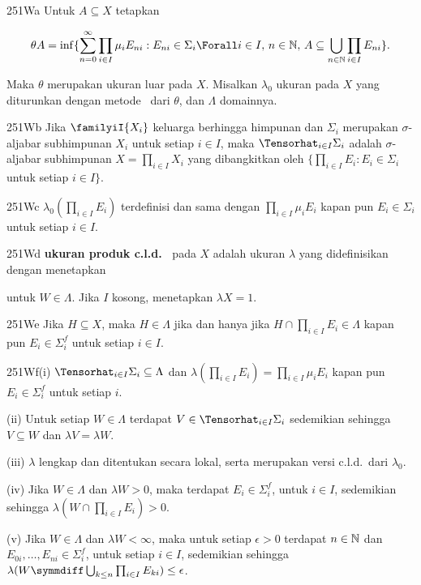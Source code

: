 \spheader 251Wa Untuk $A\subseteq X$ tetapkan

$$\theta A=\inf\{\sum_{n=0}^{\infty}\prod_{i\in I}\mu_iE_{ni}:
E_{ni}\in\Sigma_i\Forall i\in I,\,n\in\Bbb N,\,
A\subseteq\bigcup_{n\in\Bbb N}\prod_{i\in I}E_{ni}\}.$$

\noindent Maka $\theta$ merupakan ukuran luar pada $X$. Misalkan $\lambda_0$
ukuran pada $X$ yang diturunkan dengan metode \Caratheodory\ dari $\theta$, dan
$\Lambda$ domainnya.

\spheader 251Wb Jika $\familyiI{X_i}$ keluarga berhingga himpunan dan
$\Sigma_i$ merupakan $\sigma$-aljabar subhimpunan $X_i$ untuk setiap $i\in I$,
maka $\Tensorhat_{i\in I}\Sigma_i$ adalah $\sigma$-aljabar subhimpunan
$X=\prod_{i\in I}X_i$ yang dibangkitkan oleh $\{\prod_{i\in I}E_i:E_i\in\Sigma_i$
untuk setiap $i\in I\}$. 

\spheader 251Wc $\lambda_0(\prod_{i\in I}E_i)$ terdefinisi dan sama dengan
$\prod_{i\in I}\mu_iE_i$ kapan pun $E_i\in\Sigma_i$ untuk setiap $i\in I$.

\spheader 251Wd {\bf ukuran produk c.l.d.\ } pada $X$ adalah ukuran
$\lambda$ yang didefinisikan dengan menetapkan


\noindent untuk $W\in\Lambda$. Jika $I$ kosong,  menetapkan
$\lambda X=1$.

\spheader 251We Jika $H\subseteq X$, maka $H\in\Lambda$ jika dan hanya jika
$H\cap\prod_{i\in I}E_i\in\Lambda$ kapan pun $E_i\in\Sigma_i^f$ untuk setiap
$i\in I$.

\spheader 251Wf(i) $\Tensorhat_{i\in I}\Sigma_i\subseteq\Lambda$ dan
$\lambda(\prod_{i\in I}E_i)=\prod_{i\in I}\mu_iE_i$ kapan pun
$E_i\in\Sigma_i^f$ untuk setiap $i$.

\quad(ii) Untuk setiap $W\in\Lambda$ terdapat $V\in\Tensorhat_{i\in
I}\Sigma_i$ sedemikian sehingga $V\subseteq W$ dan $\lambda V=\lambda W$.

\quad(iii) $\lambda$ lengkap dan ditentukan secara lokal, serta merupakan
versi c.l.d.\ dari $\lambda_0$.

\quad(iv) Jika $W\in\Lambda$ dan $\lambda W>0$, maka terdapat
$E_i\in\Sigma_i^f$, untuk $i\in I$, sedemikian sehingga
$\lambda(W\cap\prod_{i\in I}E_i)>0$.

\quad(v) Jika $W\in\Lambda$ dan $\lambda W<\infty$, maka untuk setiap
$\epsilon>0$ terdapat $n\in\Bbb N$ dan
$E_{0i},\ldots,E_{ni}\in\Sigma_i^f$, untuk setiap $i\in I$, sedemikian sehingga
$\lambda(W\symmdiff\bigcup_{k\le n}\prod_{i\in I}E_{ki})\le\epsilon$.

